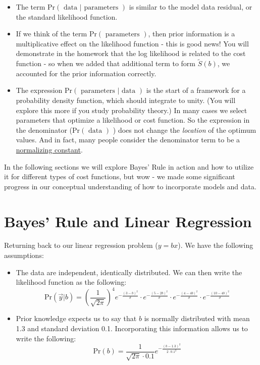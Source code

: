 \documentclass[
]{book}
\providecommand{\tightlist}{%
  \setlength{\itemsep}{0pt}\setlength{\parskip}{0pt}}
\theoremstyle{definition}
\theoremstyle{definition}
\theoremstyle{definition}
\theoremstyle{remark}
\begin{document}
\begin{itemize}
\tightlist
\item
  The term \(\mbox{Pr}( \mbox{ data } | \mbox{ parameters })\) is similar to the model data residual, or the standard likelihood function.
\item
  If we think of the term \(\mbox{Pr}( \mbox{ parameters })\), then prior information is a multiplicative effect on the likelihood function - this is good news! You will demonstrate in the homework that the log likelihood is related to the cost function - so when we added that additional term to form \(\tilde{S}(b)\), we accounted for the prior information correctly.
\item
  The expression \(\mbox{Pr}( \mbox{ parameters } | \mbox{ data })\) is the start of a framework for a probability density function, which should integrate to unity. (You will explore this more if you study probability theory.) In many cases we select parameters that optimize a likelihood or cost function. So the expression in the denominator (\(\mbox{Pr}(\mbox{ data })\) ) does not change the \emph{location} of the optimum values. And in fact, many people consider the denominator term to be a \href{https://stats.stackexchange.com/questions/12112/normalizing-constant-in-bayes-theorem}{normalizing constant}.
\end{itemize}

In the following sections we will explore Bayes' Rule in action and how to utilize it for different types of cost functions, but wow - we made some significant progress in our conceptual understanding of how to incorporate models and data.

\hypertarget{bayes-rule-and-linear-regression}{%
\section{Bayes' Rule and Linear Regression}\label{bayes-rule-and-linear-regression}}

Returning back to our linear regression problem (\(y=bx\)). We have the following assumptions:

\begin{itemize}
\tightlist
\item
  The data are independent, identically distributed. We can then write the likelihood function as the following:
  \begin{equation}
  \mbox{Pr}(\vec{y} | b) = \left( \frac{1}{\sqrt{2 \pi}}\right)^{4} e^{-\frac{(3-b)^{2}}{\sigma}} \cdot e^{-\frac{(5-2b)^{2}}{\sigma}}  \cdot e^{-\frac{(4-4b)^{2}}{\sigma}}  \cdot e^{-\frac{(10-4b)^{2}}{\sigma}}
  \end{equation}
\item
  Prior knowledge expects us to say that \(b\) is normally distributed with mean 1.3 and standard deviation 0.1. Incorporating this information allows us to write the following:
  \begin{equation}
  \mbox{Pr}(b) =\frac{1}{\sqrt{2 \pi} \cdot 0.1} e^{-\frac{(b-1.3)^{2}}{2 \cdot 0.1^{2}}}
  \end{equation}
\end{itemize}
\end{document}
